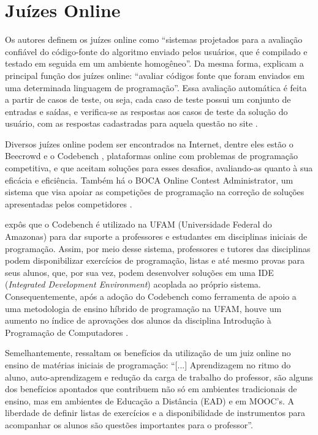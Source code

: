 \section{Juízes Online}

Os autores \textcite{wasik} definem os juízes online como “sistemas projetados para a avaliação confiável do código-fonte do algoritmo enviado pelos usuários, que é compilado e testado em seguida em um ambiente homogêneo”. Da mesma forma, \textcite[p.~1]{santosribeiro} explicam a principal função dos juízes online: “avaliar códigos fonte que foram enviados em uma determinada linguagem de programação”. Essa avaliação automática é feita a partir de casos de teste, ou seja, cada caso de teste possui um conjunto de entradas e saídas, e verifica-se as respostas aos casos de teste da solução do usuário, com as respostas cadastradas para aquela questão no site \cite[p.~12]{franciscojuniorambrosio}. 

Diversos juízes online podem ser encontrados na Internet, dentre eles estão o Beecrowd \cite{cruz2022} e o Codebench \cite[p.~806]{ribeirofernandescarvalho}, plataformas online com problemas de programação competitiva, e que aceitam soluções para esses desafios, avaliando-as quanto à sua eficácia e eficiência. Também há o BOCA Online Contest Administrator, um sistema que visa apoiar as competições de programação na correção de soluções apresentadas pelos competidores \cite{camposferreira}. 

\textcite[p.~807-808]{ribeirofernandescarvalho} expôs que o Codebench é utilizado na UFAM (Universidade Federal do Amazonas) para dar suporte a professores e estudantes em disciplinas iniciais de programação. Assim, por meio desse sistema, professores e tutores das disciplinas podem disponibilizar exercícios de programação, listas e até mesmo provas para seus alunos, que, por sua vez, podem desenvolver soluções em uma IDE (\textit{Integrated Development Environment}) acoplada ao próprio sistema. Consequentemente, após a adoção do Codebench como ferramenta de apoio a uma metodologia de ensino híbrido de programação na UFAM, houve um aumento no índice de aprovações dos alunos da disciplina Introdução à Programação de Computadores \cite[p.~148-149]{galvaofernandesgadelha}.

Semelhantemente, \textcite[p.~18-19]{franciscojuniorambrosio} ressaltam os benefícios da utilização de um juiz online no ensino de matérias iniciais de programação: “[...] Aprendizagem no ritmo do aluno, auto-aprendizagem e redução da carga de trabalho do professor, são alguns dos benefícios apontados que contribuem não só em ambientes tradicionais de ensino, mas em ambientes de Educação a Distância (EAD) e em MOOC’s. A liberdade de definir listas de exercícios e a disponibilidade de instrumentos para acompanhar os alunos são questões importantes para o professor”.

